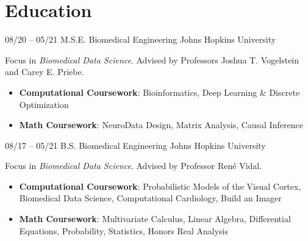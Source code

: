 \section{Education}

\cventry
{08/20 -- 05/21}
{M.S.E. Biomedical Engineering}
{%
}
{Johns Hopkins University}
{}
{
Focus in \textit{Biomedical Data Science}.
Advised by Professors Joshua T. Vogelstein and Carey E. Priebe.
\begin{itemize}
    \item {\textbf{Computational Coursework}: Bioinformatics, Deep Learning \& Discrete Optimization}
    \item {\textbf{Math Coursework}: NeuroData Design, Matrix Analysis, Causal Inference}
\end{itemize}
}

\cventry
{08/17 -- 05/21}
{B.S. Biomedical Engineering}
{%
}
{Johns Hopkins University}
{}
{
Focus in \textit{Biomedical Data Science}.
Advised by Professor Ren\'{e} Vidal.
\begin{itemize}
    \item {\textbf{Computational Coursework}: Probabilistic Models of the Visual Cortex, Biomedical Data Science, Computational Cardiology, Build an Imager}
    \item {\textbf{Math Coursework}: Multivariate Calculus, Linear Algebra, Differential Equations, Probability, Statistics, Honors Real Analysis}
\end{itemize}
}
